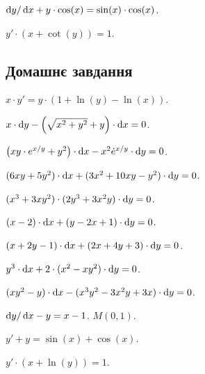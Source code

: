 \begin{problem}
	$\mathop{}\!\mathrm{d} y / \mathop{}\!\mathrm{d} x + y \cdot \cos (x) = \sin (x) \cdot \cos (x)$.
\end{problem}

\begin{problem}
	$y' \cdot (x + \cot (y)) = 1$.
\end{problem}

\subsection*{Домашнє завдання}

\begin{problem}
	$x \cdot y' = y \cdot (1 + \ln (y) - \ln (x))$.
\end{problem}

\begin{problem}
	$x \cdot \mathop{}\!\mathrm{d} y - \left( \sqrt{x^2 + y^2} + y \right) \cdot \mathop{}\!\mathrm{d} x = 0$.
\end{problem}

\begin{problem}
	$\left( x y \cdot e^{x / y} + y^2 \right) \cdot \mathop{}\!\mathrm{d} x - x^2 \dot e^{x / y} \cdot \mathop{}\!\mathrm{d} y = 0$.
\end{problem}

\begin{problem}
	$(6 x y + 5 y^2) \cdot \mathop{}\!\mathrm{d} x + (3 x^2 + 10 x y - y^2) \cdot \mathop{}\!\mathrm{d} y = 0$.
\end{problem}

\begin{problem}
	$(x^3 + 3 x y^2) \cdot (2 y^3 + 3 x^2 y) \cdot \mathop{}\!\mathrm{d} y = 0$.
\end{problem}

\begin{problem}
	$(x - 2) \cdot \mathop{}\!\mathrm{d} x + (y - 2 x + 1) \cdot \mathop{}\!\mathrm{d} y = 0$.
\end{problem}

\begin{problem}
	$(x + 2 y - 1) \cdot \mathop{}\!\mathrm{d} x + (2 x + 4 y + 3) \cdot \mathop{}\!\mathrm{d} y = 0$.
\end{problem}

\begin{problem}
	$y^3 \cdot \mathop{}\!\mathrm{d} x + 2 \cdot (x^2 - x y^2) \cdot \mathop{}\!\mathrm{d} y = 0$.
\end{problem}

\begin{problem}
	$(x y^2 - y) \cdot \mathop{}\!\mathrm{d} x - (x^3 y^2 - 3 x^2 y + 3 x) \cdot \mathop{}\!\mathrm{d} y = 0$.
\end{problem}

\begin{problem}
	$\mathop{}\!\mathrm{d} y / \mathop{}\!\mathrm{d} x - y = x - 1$.  $M(0,1)$.
\end{problem}

\begin{problem}
	$y' + y = \sin (x) + \cos (x)$.
\end{problem}

\begin{problem}
	$y' \cdot (x + \ln (y)) = 1$.
\end{problem}

